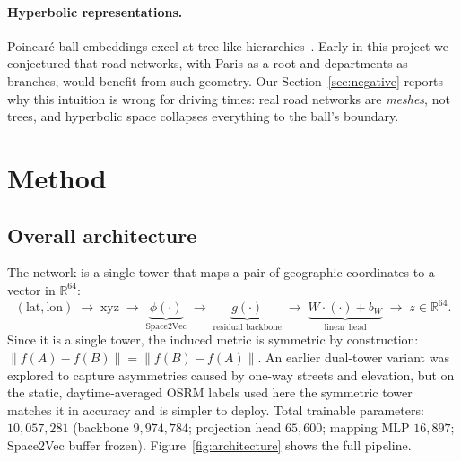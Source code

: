 \documentclass[11pt,a4paper]{article}
\begin{document}
\paragraph{Hyperbolic representations.}
Poincar\'e-ball embeddings excel at tree-like
hierarchies~\cite{nickel2017poincare,ganea2018hyperbolic}. Early in
this project we conjectured that road networks, with Paris as a root
and departments as branches, would benefit from such geometry. Our
Section~\ref{sec:negative} reports why this intuition is wrong for
driving times: real road networks are \emph{meshes}, not trees, and
hyperbolic space collapses everything to the ball's boundary.

\section{Method}
\label{sec:method}

\subsection{Overall architecture}
The network is a single tower that maps a pair of geographic
coordinates to a vector in $\mathbb{R}^{64}$:
\[
  (\text{lat}, \text{lon}) \;\longrightarrow\;
  \text{xyz} \;\longrightarrow\;
  \underbrace{\phi(\cdot)}_{\text{Space2Vec}} \;\longrightarrow\;
  \underbrace{g(\cdot)}_{\text{residual backbone}} \;\longrightarrow\;
  \underbrace{W \cdot (\cdot) + b_W}_{\text{linear head}}
  \;\longrightarrow\; z \in \mathbb{R}^{64}.
\]
Since it is a single tower, the induced metric is symmetric by
construction: $\|f(A) - f(B)\| = \|f(B) - f(A)\|$. An earlier
dual-tower variant was explored to capture asymmetries caused by
one-way streets and elevation, but on the static, daytime-averaged
OSRM labels used here the symmetric tower matches it in accuracy and
is simpler to deploy. Total trainable parameters: $10{,}057{,}281$
(backbone $9{,}974{,}784$; projection head $65{,}600$; mapping MLP
$16{,}897$; Space2Vec buffer frozen).
Figure~\ref{fig:architecture} shows the full pipeline.
\end{document}
